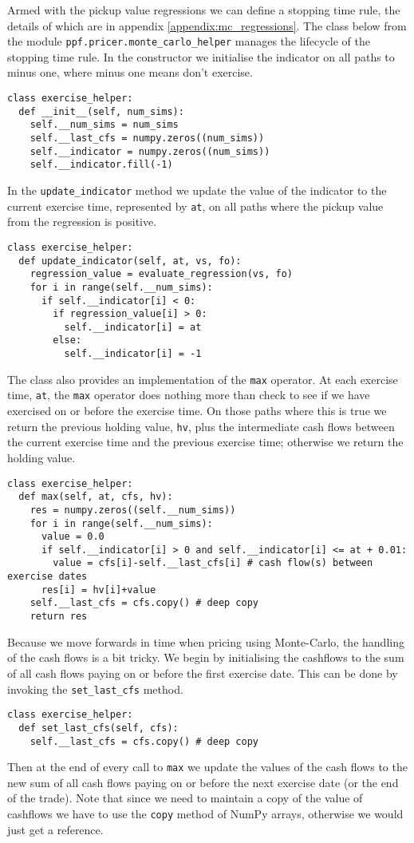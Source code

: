 Armed with the pickup value regressions we can define a stopping time
rule, the details of which are in appendix
\ref{appendix:mc_regressions}. The class below from the module
\verb|ppf.pricer.monte_carlo_helper| manages the lifecycle of the
stopping time rule. In the constructor we initialise the indicator on
all paths to minus one, where minus one means don't exercise. 
\begin{verbatim}
class exercise_helper:
  def __init__(self, num_sims):
    self.__num_sims = num_sims
    self.__last_cfs = numpy.zeros((num_sims))
    self.__indicator = numpy.zeros((num_sims))
    self.__indicator.fill(-1)
\end{verbatim}
In the \verb|update_indicator| method we update the value of the indicator to
the current exercise time, represented by \verb|at|, on all paths
where the pickup value from the regression is positive. 
\begin{verbatim}
class exercise_helper:
  def update_indicator(self, at, vs, fo):
    regression_value = evaluate_regression(vs, fo)
    for i in range(self.__num_sims):
      if self.__indicator[i] < 0:
        if regression_value[i] > 0:
          self.__indicator[i] = at
        else:
          self.__indicator[i] = -1
\end{verbatim}
The class also
provides an implementation of the \verb|max| operator. At each
exercise time, \verb|at|, the \verb|max| operator does nothing more
than check to see if we have exercised on or before the exercise time.
On those paths where this is true we return the previous holding
value, \verb|hv|, plus the intermediate cash flows between the current
exercise time and the previous exercise time; otherwise we return the
holding value. 
\begin{verbatim}
class exercise_helper:
  def max(self, at, cfs, hv):
    res = numpy.zeros((self.__num_sims))
    for i in range(self.__num_sims):
      value = 0.0
      if self.__indicator[i] > 0 and self.__indicator[i] <= at + 0.01:
        value = cfs[i]-self.__last_cfs[i] # cash flow(s) between exercise dates
      res[i] = hv[i]+value      
    self.__last_cfs = cfs.copy() # deep copy
    return res    
\end{verbatim}
Because we move forwards in time when pricing using
Monte-Carlo, the handling of the cash flows is a bit tricky. We begin
by initialising the cashflows to the sum of all cash flows paying on
or before the first exercise date. This can be done by invoking the
\verb|set_last_cfs| method. 
\begin{verbatim}
class exercise_helper:
  def set_last_cfs(self, cfs):
    self.__last_cfs = cfs.copy() # deep copy 
\end{verbatim}
Then at the end of every call to
\verb|max| we update the values of the cash flows to the
new sum of all cash flows paying on or before the next exercise date
(or the end of the trade). Note that since we need to maintain a copy
of the value of cashflows we have to use the \verb|copy| method of
NumPy arrays, otherwise we would just get a reference.

